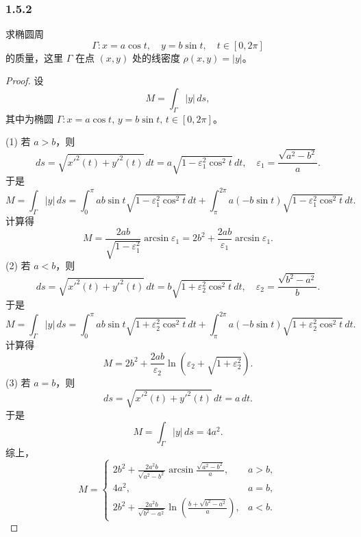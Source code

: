 \documentclass[12pt]{ctexart}
\begin{document}
\subsubsection*{1.5.2}
求椭圆周
\[
\Gamma: x = a \cos t, \quad y = b \sin t, \quad t \in [0, 2\pi]
\]
的质量，这里 $\Gamma$ 在点 $(x, y)$ 处的线密度 $\rho(x, y) = |y|$。

\begin{proof}
	 设
\[
M = \int_\Gamma |y| \, ds,
\]
其中为椭圆 $\Gamma: x = a \cos t, \, y = b \sin t, \, t \in [0, 2\pi]$。

(1) 若 $a > b$，则
\[
ds = \sqrt{x'^2(t) + y'^2(t)} \, dt = a \sqrt{1 - \varepsilon_1^2 \cos^2 t} \, dt, \quad \varepsilon_1 = \frac{\sqrt{a^2 - b^2}}{a}.
\]
于是
\[
M = \int_\Gamma |y| \, ds = \int_0^\pi ab \sin t \sqrt{1 - \varepsilon_1^2 \cos^2 t} \, dt + \int_\pi^{2\pi} a(-b \sin t) \sqrt{1 - \varepsilon_1^2 \cos^2 t} \, dt.
\]
计算得
\[
M = \frac{2ab}{\sqrt{1 - \varepsilon_1^2}} \arcsin \varepsilon_1 = 2b^2 + \frac{2ab}{\varepsilon_1} \arcsin \varepsilon_1.
\]
(2) 若 $a < b$，则
\[
ds = \sqrt{x'^2(t) + y'^2(t)} \, dt = b \sqrt{1 + \varepsilon_2^2 \cos^2 t} \, dt, \quad \varepsilon_2 = \frac{\sqrt{b^2 - a^2}}{b}.
\]
于是
\[
M = \int_\Gamma |y| \, ds = \int_0^\pi ab \sin t \sqrt{1 + \varepsilon_2^2 \cos^2 t} \, dt + \int_\pi^{2\pi} a(-b \sin t) \sqrt{1 + \varepsilon_2^2 \cos^2 t} \, dt.
\]
计算得
\[
M = 2b^2 + \frac{2ab}{\varepsilon_2} \ln(\varepsilon_2 + \sqrt{1 + \varepsilon_2^2}).
\]
(3) 若 $a = b$，则
\[
ds = \sqrt{x'^2(t) + y'^2(t)} \, dt = a \, dt.
\]
于是
\[
M = \int_\Gamma |y| \, ds = 4a^2.
\]
综上，
\[
M =
\begin{cases}
2b^2 + \frac{2a^2b}{\sqrt{a^2 - b^2}} \arcsin \frac{\sqrt{a^2 - b^2}}{a}, & a > b, \\
4a^2, & a = b, \\
2b^2 + \frac{2a^2b}{\sqrt{b^2 - a^2}} \ln\left(\frac{b + \sqrt{b^2 - a^2}}{a}\right), & a < b.
\end{cases}
\]
\end{proof}
\end{document}
